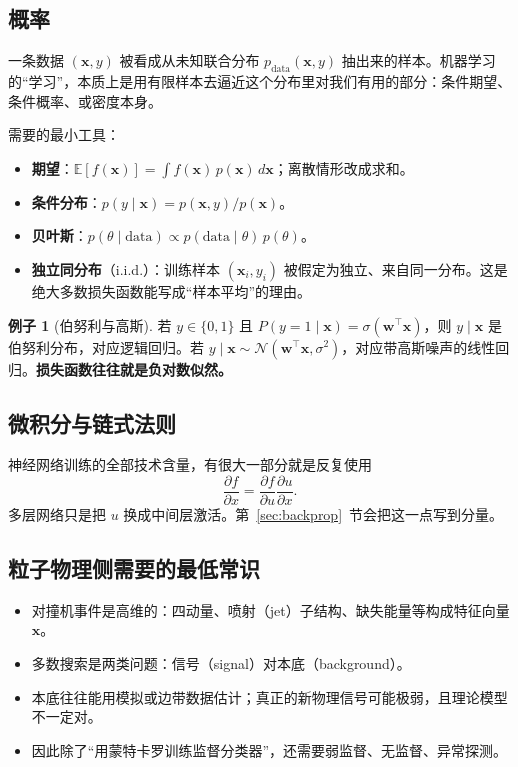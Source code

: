 \documentclass[11pt,a4paper]{article}
\theoremstyle{definition}
\newtheorem{example}{例子}[section]
\theoremstyle{plain}
\theoremstyle{remark}
\newcommand{\E}{\mathbb{E}}
\newcommand{\sigm}{\sigma}
\begin{document}
\subsection{概率}

一条数据 $(\mathbf{x},y)$ 被看成从未知联合分布 $p_{\mathrm{data}}(\mathbf{x},y)$ 抽出来的样本。机器学习的``学习''，本质上是用有限样本去逼近这个分布里对我们有用的部分：条件期望、条件概率、或密度本身。

需要的最小工具：
\begin{itemize}[leftmargin=1.4em]
  \item \textbf{期望}：$\E[f(\mathbf{x})]=\int f(\mathbf{x})\,p(\mathbf{x})\,d\mathbf{x}$；离散情形改成求和。
  \item \textbf{条件分布}：$p(y\mid\mathbf{x})=p(\mathbf{x},y)/p(\mathbf{x})$。
  \item \textbf{贝叶斯}：$p(\theta\mid\mathrm{data})\propto p(\mathrm{data}\mid\theta)\,p(\theta)$。
  \item \textbf{独立同分布}（i.i.d.）：训练样本 $(\mathbf{x}_i,y_i)$ 被假定为独立、来自同一分布。这是绝大多数损失函数能写成``样本平均''的理由。
\end{itemize}

\begin{example}[伯努利与高斯]
若 $y\in\{0,1\}$ 且 $P(y=1\mid\mathbf{x})=\sigm(\mathbf{w}^\top\mathbf{x})$，则 $y\mid\mathbf{x}$ 是伯努利分布，对应逻辑回归。若 $y\mid\mathbf{x}\sim\mathcal{N}(\mathbf{w}^\top\mathbf{x},\sigma^2)$，对应带高斯噪声的线性回归。\textbf{损失函数往往就是负对数似然。}
\end{example}

\subsection{微积分与链式法则}

神经网络训练的全部技术含量，有很大一部分就是反复使用
\begin{equation}
  \frac{\partial f}{\partial x}=\frac{\partial f}{\partial u}\frac{\partial u}{\partial x}.
\end{equation}
多层网络只是把 $u$ 换成中间层激活。第~\ref{sec:backprop}~节会把这一点写到分量。

\subsection{粒子物理侧需要的最低常识}

\begin{itemize}[leftmargin=1.4em]
  \item 对撞机事件是高维的：四动量、喷射（jet）子结构、缺失能量等构成特征向量 $\mathbf{x}$。
  \item 多数搜索是两类问题：信号（signal）对本底（background）。
  \item 本底往往能用模拟或边带数据估计；真正的新物理信号可能极弱，且理论模型不一定对。
  \item 因此除了``用蒙特卡罗训练监督分类器''，还需要弱监督、无监督、异常探测。
\end{itemize}
\end{document}
